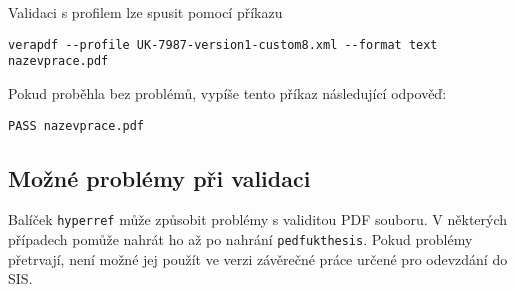 \documentclass{ltxdoc}
\newcommand\pkgname{\texttt{pedfukthesis}}
\begin{document}
Validaci s profilem lze spusit pomocí příkazu

\begin{verbatim}
verapdf --profile UK-7987-version1-custom8.xml --format text nazevprace.pdf
\end{verbatim}

Pokud proběhla bez problémů, vypíše tento příkaz následující odpověď:

\begin{verbatim}
PASS nazevprace.pdf
\end{verbatim}

\subsection{Možné problémy při validaci}

Balíček \texttt{hyperref} může způsobit problémy s validitou PDF souboru. V některých případech
pomůže nahrát ho až po nahrání \pkgname. Pokud problémy přetrvají, není možné
jej použít ve verzi závěrečné práce určené pro odevzdání do SIS.
\end{document}
